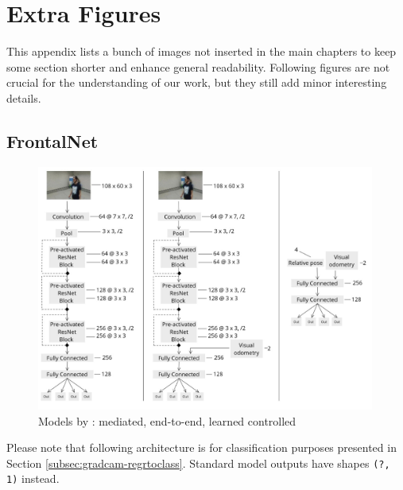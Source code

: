 
\chapter{Extra Figures}
\label{chap:extra-figures}

This appendix lists a bunch of images not inserted in the main chapters to keep some section shorter and enhance general readability. Following figures are not crucial for the understanding of our work, but they still add minor interesting details.




\section{FrontalNet}
\label{sec:extra-frontalnet}

\begin{figure}[!h]
	\centering
	\includegraphics[width=0.99\textwidth]{"contents/images/03-frontalnet-1"}
	\caption[Models by \cite{mantegazza2019visionbased}: mediated, end-to-end, learned controlled]{Models by \cite{mantegazza2019visionbased}: mediated, end-to-end, learned controlled}
	\label{fig:frontalnet-architecture-paper3approaches}
\end{figure}

Please note that following architecture is for classification purposes presented in Section \ref{subsec:gradcam-regrtoclass}. Standard model outputs have shapes \texttt{(?, 1)} instead.


